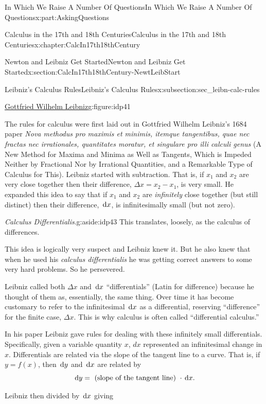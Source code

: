 \documentclass[oneside,10pt,]{book}
\numberwithin{equation}{section}
\newcommand{\dx}[1]{\,{\rm d}#1}
\begin{document}
\begin{partptx}{In Which We Raise A Number Of Questions}{}{In Which We Raise A Number Of Questions}{}{}{x:part:AskingQuestions}
\begin{chapterptx}{Calculus in the 17th and 18th Centuries}{}{Calculus in the 17th and 18th Centuries}{}{}{x:chapter:CalcIn17th18thCentury}
\begin{sectionptx}{Newton and Leibniz Get Started}{}{Newton and Leibniz Get Started}{}{}{x:section:CalcIn17th18thCentury-NewtLeibStart}
\begin{subsectionptx}{Leibniz's Calculus Rules}{}{Leibniz's Calculus Rules}{}{}{x:subsection:sec_leibn-calc-rules}
\begin{figureptx}{\href{https://mathshistory.st-andrews.ac.uk/Biographies/Leibniz/}{Gottfried Wilhelm Leibniz}\protect\footnotemark{}}{g:figure:idp41}{}
\begin{image}{0.325}{0.35}{0.325}
\end{image}%
\tcblower
\end{figureptx}%
%
The rules for calculus were first laid out in Gottfried Wilhelm Leibniz's 1684 paper \textit{Nova methodus pro maximis et minimis, itemque tangentibus, quae nec fractas nec irrationales, quantitates moratur, et singulare pro illi calculi genus} (A New Method for Maxima and Minima as Well as Tangents, Which is Impeded Neither by Fractional Nor by Irrational Quantities, and a Remarkable Type of Calculus for This). Leibniz started with subtraction.  That is, if \(x_1\) and \(x_2\) are very close together then their difference, \(\Delta
x=x_2-x_1\), is very small.  He expanded this idea to say that if \(x_1\) and \(x_2\) are \emph{infinitely} close together (but still distinct) then their difference, \(\dx{ x}\), is infinitesimally small (but not zero).%
\begin{aside}{\textit{Calculus Differentialis}.}{g:aside:idp43}%
This translates, loosely, as the calculus of differences.%
\end{aside}
This idea is logically very suspect and Leibniz knew it.  But he also knew that when he used his \textit{calculus differentialis} he was getting correct answers to some very hard problems.  So he persevered.%
\par
Leibniz called both \(\Delta x\) and \(\dx{ x}\) ``differentials'' (Latin for difference) because he thought of them as, essentially, the same thing.  Over time it has become customary to refer to the infinitesimal \(\dx{ x}\) as a differential, reserving ``difference'' for the finite case, \(\Delta x\).  This is why calculus is often called ``differential calculus.''%
\par
In his paper Leibniz gave rules for dealing with these infinitely small differentials.  Specifically, given a variable quantity \(x\), \(dx\) represented an infinitesimal change in \(x\).  Differentials are related via the slope of the tangent line to a curve.  That is, if \(y=f(x)\), then \(\dx{ y}\) and \(\dx{ x}\) are related by%
\begin{equation*}
\dx{ y}=\text{ (slope of the tangent line) } \cdot \dx{ x}\text{.}
\end{equation*}
%
\par
Leibniz then divided by \(\dx{ x}\) giving%
\begin{equation*}

\end{equation*}
\end{subsectionptx}
\end{sectionptx}
\end{chapterptx}
\end{partptx}
\end{document}
